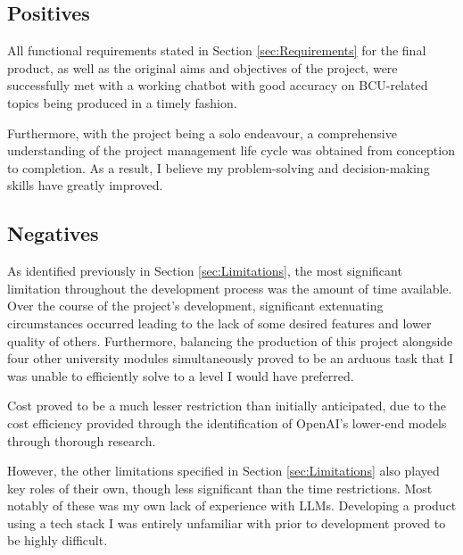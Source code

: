 \subsection{Positives}
All functional requirements stated in Section \ref{sec:Requirements} for the final product, as well as the original aims and objectives 
of the project, were successfully met with a working chatbot with good accuracy on BCU-related topics being produced in a timely fashion.

\para Furthermore, with the project being a solo endeavour, a comprehensive understanding of the project management life cycle was 
obtained from conception to completion. As a result, I believe my problem-solving and decision-making skills have greatly improved.   

\subsection{Negatives}
As identified previously in Section \ref{sec:Limitations}, the most significant limitation throughout the development process 
was the amount of time available. Over the course of the project's development, significant extenuating circumstances occurred 
leading to the lack of some desired features and lower quality of others. Furthermore, balancing the production of this project 
alongside four other university modules simultaneously proved to be an arduous task that I was unable to efficiently solve to 
a level I would have preferred.

\para Cost proved to be a much lesser restriction than initially anticipated, due to the cost efficiency 
provided through the identification of OpenAI's lower-end models through thorough research. 

\para However, the other limitations specified in Section \ref{sec:Limitations} also played key roles of their own, though less significant 
than the time restrictions. Most notably of these was my own lack of experience with LLMs. Developing a product using a tech stack 
I was entirely unfamiliar with prior to development proved to be highly difficult.